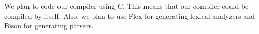 We plan to code our compiler using C. This means that our compiler could be compiled by itself. Also, we plan to use Flex for generating lexical analyzers and Bison for generating parsers.